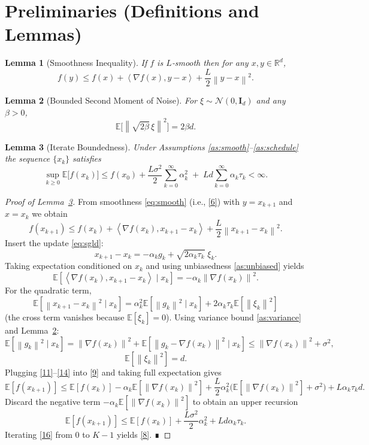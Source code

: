 \documentclass{article}
\newtheorem{lemma}{Lemma}
\newcommand{\E}{\mathbb{E}}
\newcommand{\R}{\mathbb{R}}
\newcommand{\norm}[1]{\left\|#1\right\|}
\newcommand{\inner}[2]{\left\langle #1,#2 \right\rangle}
\begin{document}
\newpage
\section*{Preliminaries (Definitions and Lemmas)}
\begin{lemma}[Smoothness Inequality]\label{lem:smooth}
If $f$ is $L$‑smooth then for any $x,y\in\R^{d}$,
\[
f(y)\le f(x)+\inner{\nabla f(x)}{y-x}+\frac{L}{2}\norm{y-x}^{2}.
\tag{6}
\]
\end{lemma}
\begin{lemma}[Bounded Second Moment of Noise]\label{lem:noise}
For $\xi\sim\mathcal N(0,\mathbf I_{d})$ and any $\beta>0$,
\[
\E\bigl[\norm{\sqrt{2\beta}\,\xi}^{2}\bigr]=2\beta d.
\tag{7}
\]
\end{lemma}
\begin{lemma}[Iterate Boundedness]\label{lem:bounded}
Under Assumptions \ref{as:smooth}–\ref{as:schedule} the sequence $\{x_{k}\}$ satisfies
\[
\sup_{k\ge0}\E\bigl[f(x_{k})\bigr]\le f(x_{0})+\frac{L\sigma^{2}}{2}\sum_{k=0}^{\infty}\alpha_{k}^{2}
\;+\;L d\sum_{k=0}^{\infty}\alpha_{k}\tau_{k}<\infty .
\tag{8}
\]
\end{lemma}
\begin{proof}[Proof of Lemma~\ref{lem:bounded}]
From smoothness \eqref{eq:smooth} (i.e., \eqref{6}) with $y=x_{k+1}$ and $x=x_{k}$ we obtain
\[
f(x_{k+1})\le f(x_{k})+\inner{\nabla f(x_{k})}{x_{k+1}-x_{k}}+\frac{L}{2}\norm{x_{k+1}-x_{k}}^{2}.
\tag{9}
\]
Insert the update \eqref{eq:sgld}:
\[
x_{k+1}-x_{k}= -\alpha_{k}g_{k}+ \sqrt{2\alpha_{k}\tau_{k}}\;\xi_{k}.
\tag{10}
\]
Taking expectation conditioned on $x_{k}$ and using unbiasedness \eqref{as:unbiased} yields
\[
\E\!\left[\inner{\nabla f(x_{k})}{x_{k+1}-x_{k}}\mid x_{k}\right]
= -\alpha_{k}\norm{\nabla f(x_{k})}^{2}.
\tag{11}
\]
For the quadratic term,
\[
\E\!\left[\norm{x_{k+1}-x_{k}}^{2}\mid x_{k}\right]
= \alpha_{k}^{2}\E\!\left[\norm{g_{k}}^{2}\mid x_{k}\right]
+2\alpha_{k}\tau_{k}\E\!\left[\norm{\xi_{k}}^{2}\right]
\tag{12}
\]
(the cross term vanishes because $\E[\xi_{k}]=0$). Using variance bound \eqref{as:variance} and Lemma~\ref{lem:noise}:
\[
\E\!\left[\norm{g_{k}}^{2}\mid x_{k}\right]
= \norm{\nabla f(x_{k})}^{2}+\E\!\left[\norm{g_{k}-\nabla f(x_{k})}^{2}\mid x_{k}\right]
\le \norm{\nabla f(x_{k})}^{2}+\sigma^{2},
\tag{13}
\]
\[
\E\!\left[\norm{\xi_{k}}^{2}\right]=d.
\tag{14}
\]
Plugging \eqref{11}–\eqref{14} into \eqref{9} and taking full expectation gives
\[
\E[f(x_{k+1})]\le \E[f(x_{k})]
-\alpha_{k}\E\!\left[\norm{\nabla f(x_{k})}^{2}\right]
+\frac{L}{2}\alpha_{k}^{2}\bigl(\E\!\left[\norm{\nabla f(x_{k})}^{2}\right]+\sigma^{2}\bigr)
+L\alpha_{k}\tau_{k}d .
\tag{15}
\]
Discard the negative term $-\alpha_{k}\E\!\left[\norm{\nabla f(x_{k})}^{2}\right]$ to obtain an upper recursion
\[
\E[f(x_{k+1})]\le \E[f(x_{k})]
+\frac{L\sigma^{2}}{2}\alpha_{k}^{2}+L d\alpha_{k}\tau_{k}.
\tag{16}
\]
Iterating \eqref{16} from $0$ to $K-1$ yields \eqref{8}. ∎
\end{proof}
\end{document}
